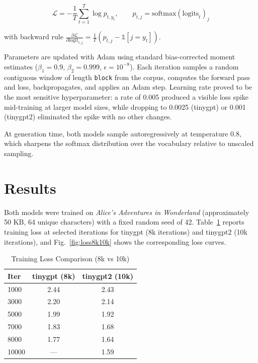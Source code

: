 \documentclass[conference]{IEEEtran}
\begin{document}
\begin{equation}
\mathcal{L} = -\frac{1}{T}\sum_{t=1}^{T} \log p_{t,y_t}, \qquad p_{t,j} = \text{softmax}(\text{logits}_t)_j
\end{equation}

with backward rule $\frac{\partial \mathcal{L}}{\partial \text{logit}_{t,j}} = \frac{1}{T}(p_{t,j} - \mathbb{1}[j=y_t])$.

Parameters are updated with Adam \cite{kingma2015adam} using standard bias-corrected moment estimates ($\beta_1=0.9$, $\beta_2=0.999$, $\epsilon=10^{-8}$). Each iteration samples a random contiguous window of length \texttt{block} from the corpus, computes the forward pass and loss, backpropagates, and applies an Adam step. Learning rate proved to be the most sensitive hyperparameter: a rate of 0.005 produced a visible loss spike mid-training at larger model sizes, while dropping to 0.0025 (tinygpt) or 0.001 (tinygpt2) eliminated the spike with no other changes.

At generation time, both models sample autoregressively at temperature 0.8, which sharpens the softmax distribution over the vocabulary relative to unscaled sampling.

\section{Results}
Both models were trained on \textit{Alice's Adventures in Wonderland} (approximately 50 KB, 64 unique characters) with a fixed random seed of 42. Table~\ref{tab:loss} reports training loss at selected iterations for tinygpt (8k iterations) and tinygpt2 (10k iterations), and Fig.~\ref{fig:loss8k10k} shows the corresponding loss curves.

\begin{table}[h]
\centering
\caption{Training Loss Comparison (8k vs 10k)}
\label{tab:loss}
\begin{tabular}{lcc}
\toprule
Iter & tinygpt (8k) & tinygpt2 (10k) \\
\midrule
1000 & 2.44 & 2.43 \\
3000 & 2.20 & 2.14 \\
5000 & 1.99 & 1.92 \\
7000 & 1.83 & 1.68 \\
8000 & 1.77 & 1.64 \\
10000 & --- & 1.59 \\
\bottomrule
\end{tabular}
\end{table}
\end{document}
